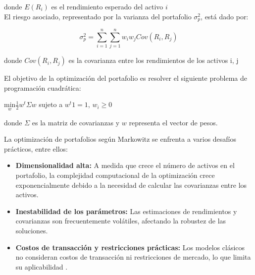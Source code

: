 \documentclass[9pt,a4paper,twoside]{rho-class/rho}
\begin{document}
            donde $E\left({R}_{i}\right)$ es el rendimiento esperado del activo $i$
            \\

            El riesgo asociado, representado por la varianza del portafolio ${\sigma }^{2}_{p}$, está dado por:

            \begin{equation}
            {\sigma }^{2}_{p}=\sum _{i=1}^{n}\sum _{j=1}^{n}{w}_{i}{w}_{j}Cov\left({R}_{i},{R}_{j}\right)
            \end{equation}

            donde $Cov\left({R}_{i},{R}_{j}\right)$ es la covarianza entre los rendimientos de los activos {i}, {j}

            \vspace{2mm}El objetivo de la optimización del portafolio es resolver el siguiente problema de programación cuadrática:

            \begin{center}
                $\underset{w}{\mathrm{min}}\frac{1}{2}{w}^{t}\Sigma w$ sujeto a ${w}^{t}1=1$, ${w}_{i}\ge 0$     
            \end{center}

            \vspace{2mm}donde $\Sigma $ es la matriz de covarianzas y ${w}$ representa el vector de pesos.

            \vspace{2mm}La optimización de portafolios según Markowitz se enfrenta a varios desafíos prácticos, entre ellos:

            \begin{itemize}
                \item \textbf{Dimensionalidad alta:} A medida que crece el número de  activos en el portafolio, la complejidad computacional de la optimización crece exponencialmente debido a la necesidad de calcular las covarianzas entre los activos.
                \item \textbf{Inestabilidad de los parámetros:} Las estimaciones de rendimientos y covarianzas son frecuentemente volátiles, afectando la robustez de las soluciones.
                \item \textbf{Costos de transacción y restricciones prácticas:} Los modelos clásicos no consideran costos de transacción ni restricciones de mercado, lo que limita su aplicabilidad \cite{Deb2001}.
            \end{itemize}
\end{document}
